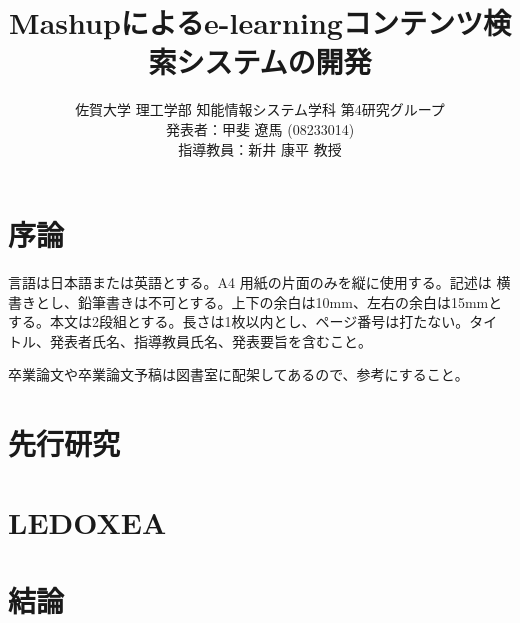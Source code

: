 \documentclass[twocolumn,a4j]{jarticle}
\title{Mashupによるe-learningコンテンツ検索システムの開発}
\author{佐賀大学 理工学部 知能情報システム学科 第4研究グループ\\ 発表者：甲斐 遼馬 (08233014)\\ 指導教員：新井 康平 教授}
\begin{document}
\date{\empty}
\maketitle
\thispagestyle{empty}

\section{序論}
言語は日本語または英語とする。A4 用紙の片面のみを縦に使用する。記述は
横書きとし、鉛筆書きは不可とする。上下の余白は10mm、左右の余白は15mmと
する。本文は2段組とする。長さは1枚以内とし、ページ番号は打たない。タイ
トル、発表者氏名、指導教員氏名、発表要旨を含むこと。

卒業論文や卒業論文予稿は図書室に配架してあるので、参考にすること。

\section{先行研究}

\section{LEDOXEA}

\section{結論}


\begin{thebibliography}{9}\setlength{\itemsep}{2ex}\small
\bibitem{}
\end{thebibliography}
\end{document}
